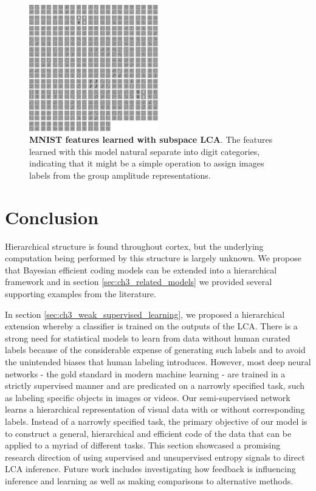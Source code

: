 \begin{figure}[h]
    \centering
    \includegraphics[width=0.5\textwidth]{figures/subspace_lca_mnist_features.png}
    \caption{\textbf{MNIST features learned with subspace LCA}. The features learned with this model natural separate into digit categories, indicating that it might be a simple operation to assign images labels from the group amplitude representations.}
    \label{fig:ch3_subspace_lca_mnist_features}
\end{figure}

\section{Conclusion}
Hierarchical structure is found throughout cortex, but the underlying computation being performed by this structure is largely unknown. We propose that Bayesian efficient coding models can be extended into a hierarchical framework and in section \ref{sec:ch3_related_models} we provided several supporting examples from the literature.

In section \ref{sec:ch3_weak_supervised_learning}, we proposed a hierarchical extension whereby a classifier is trained on the outputs of the LCA. There is a strong need for statistical models to learn from data without human curated labels because of the considerable expense of generating such labels and to avoid the unintended biases that human labeling introduces. However, most deep neural networks - the gold standard in modern machine learning - are trained in a strictly supervised manner and are predicated on a narrowly specified task, such as labeling specific objects in images or videos. Our semi-supervised network learns a hierarchical representation of visual data with or without corresponding labels. Instead of a narrowly specified task, the primary objective of our model is to construct a general, hierarchical and efficient code of the data that can be applied to a myriad of different tasks. This section showcased a promising research direction of using supervised and unsupervised entropy signals to direct LCA inference. Future work includes investigating how feedback is influencing inference and learning as well as making comparisons to alternative methods.

